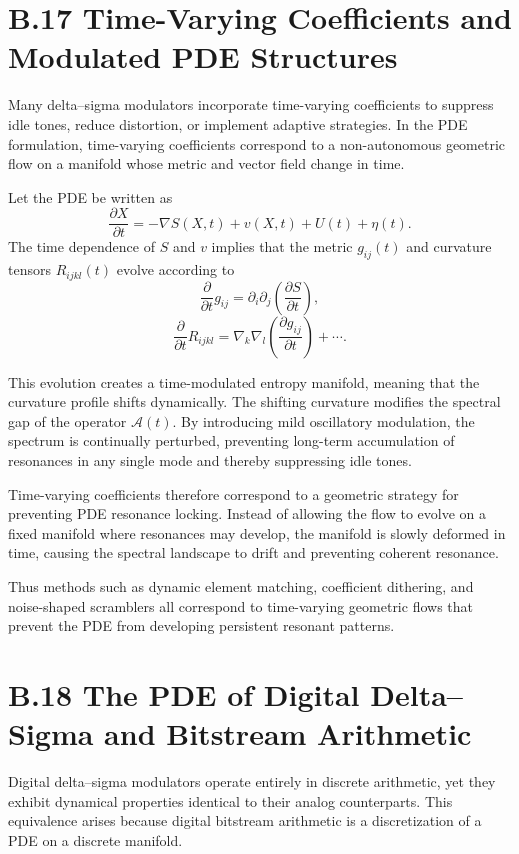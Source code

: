 \section{B.17 Time-Varying Coefficients and Modulated PDE Structures}

Many delta–sigma modulators incorporate time-varying coefficients to suppress idle tones, reduce distortion, or implement adaptive strategies. In the PDE formulation, time-varying coefficients correspond to a non-autonomous geometric flow on a manifold whose metric and vector field change in time.

Let the PDE be written as
\[
\frac{\partial X}{\partial t}
= -\nabla S(X,t) + v(X,t) + U(t) + \eta(t).
\]
The time dependence of \(S\) and \(v\) implies that the metric \(g_{ij}(t)\) and curvature tensors \(R_{ijkl}(t)\) evolve according to
\[
\frac{\partial}{\partial t} g_{ij}
= \partial_{i}\partial_{j}\left(\frac{\partial S}{\partial t}\right),
\]
\[
\frac{\partial}{\partial t} R_{ijkl}
= \nabla_{k}\nabla_{l}\left(\frac{\partial g_{ij}}{\partial t}\right) + \cdots.
\]

This evolution creates a time-modulated entropy manifold, meaning that the curvature profile shifts dynamically. The shifting curvature modifies the spectral gap of the operator \(\mathcal{A}(t)\). By introducing mild oscillatory modulation, the spectrum is continually perturbed, preventing long-term accumulation of resonances in any single mode and thereby suppressing idle tones.

Time-varying coefficients therefore correspond to a geometric strategy for preventing PDE resonance locking. Instead of allowing the flow to evolve on a fixed manifold where resonances may develop, the manifold is slowly deformed in time, causing the spectral landscape to drift and preventing coherent resonance.

Thus methods such as dynamic element matching, coefficient dithering, and noise-shaped scramblers all correspond to time-varying geometric flows that prevent the PDE from developing persistent resonant patterns.

\section{B.18 The PDE of Digital Delta–Sigma and Bitstream Arithmetic}

Digital delta–sigma modulators operate entirely in discrete arithmetic, yet they exhibit dynamical properties identical to their analog counterparts. This equivalence arises because digital bitstream arithmetic is a discretization of a PDE on a discrete manifold.

